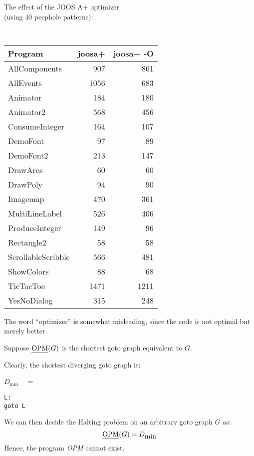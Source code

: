 \begin{slide*}
The effect of the JOOS A+ optimizer\\(using 40 peephole patterns):\\

{\tt
\begin{scriptsize}
\begin{center}
\begin{tabular}{|l|r|r|}
\hline
{\rm Program} & joosa+ & joosa+ -O\\\hline\hline
AllComponents & 907 & 861\\\hline
AllEvents & 1056 & 683\\\hline
Animator & 184 & 180\\\hline
Animator2 & 568 & 456\\\hline
ConsumeInteger & 164 & 107\\\hline
DemoFont & 97 & 89\\\hline
DemoFont2 & 213 & 147\\\hline
DrawArcs & 60 & 60\\\hline
DrawPoly & 94 &  90\\\hline
Imagemap & 470 & 361\\\hline
MultiLineLabel & 526 & 406\\\hline
ProduceInteger & 149 & 96\\\hline
Rectangle2 & 58 & 58\\\hline
ScrollableScribble & 566 & 481\\\hline
ShowColors & 88 & 68\\\hline
TicTacToe & 1471 & 1211\\\hline
YesNoDialog & 315 & 248\\\hline
\end{tabular}
\end{center}
\end{scriptsize}
}

\vfil
\end{slide*}
 
\begin{slide*}
The word ``optimizer'' is somewhat misleading, since the code is not optimal but
merely better.

Suppose $\mbox{\em OPM}(G)$ is the shortest goto graph equivalent to $G$.

Clearly, the shortest diverging goto graph is:

\begin{center}
$D_{\mbox{min}}$ ~~=~~~ \begin{minipage}{4em}
\begin{verbatim}
L:
goto L
\end{verbatim}
\end{minipage}
\end{center}

We can then decide the Halting problem on an arbitrary goto graph $G$ as:
$$ \mbox{\em OPM}(G) = D_{\mbox{min}} $$
Hence, the program {\em OPM\/} cannot exist.
\vfil
\end{slide*}
 
